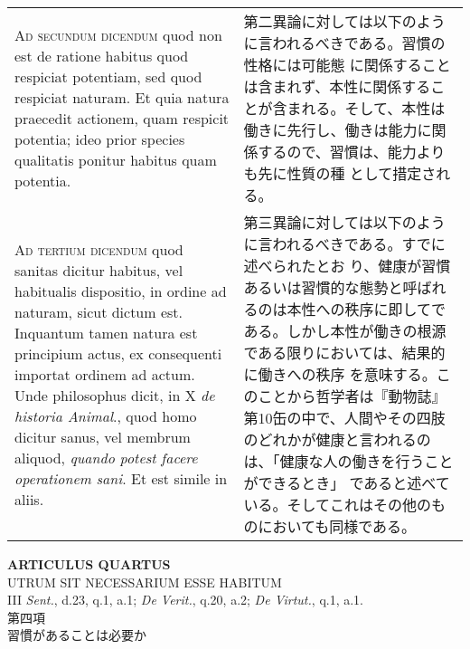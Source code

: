 \documentclass[10pt]{jsarticle} %
\begin{document}
\begin{longtable}{p{21em}p{21em}}
\\



{\scshape Ad secundum dicendum} quod non est de ratione habitus quod respiciat
potentiam, sed quod respiciat naturam. Et quia natura praecedit
actionem, quam respicit potentia; ideo prior species qualitatis
ponitur habitus quam potentia.

&

第二異論に対しては以下のように言われるべきである。習慣の性格には可能態
に関係することは含まれず、本性に関係することが含まれる。そして、本性は
働きに先行し、働きは能力に関係するので、習慣は、能力よりも先に性質の種
として措定される。

\\



{\scshape Ad tertium dicendum} quod sanitas dicitur habitus, vel habitualis
dispositio, in ordine ad naturam, sicut dictum est. Inquantum tamen
natura est principium actus, ex consequenti importat ordinem ad
actum. Unde philosophus dicit, in X {\itshape de historia Animal}., quod homo
dicitur sanus, vel membrum aliquod, {\itshape quando potest facere operationem
sani}. Et est simile in aliis.

&

第三異論に対しては以下のように言われるべきである。すでに述べられたとお
り、健康が習慣あるいは習慣的な態勢と呼ばれるのは本性への秩序に即してで
ある。しかし本性が働きの根源である限りにおいては、結果的に働きへの秩序
を意味する。このことから哲学者は『動物誌』第10缶の中で、人間やその四肢
のどれかが健康と言われるのは、「健康な人の働きを行うことができるとき」
であると述べている。そしてこれはその他のものにおいても同様である。

\\

\end{longtable}
\newpage


\begin{center}
{\Large {\bf ARTICULUS QUARTUS}}\\
{\large UTRUM SIT NECESSARIUM ESSE HABITUM}\\
{\footnotesize III {\itshape Sent.}, d.23, q.1, a.1; {\itshape De
 Verit.}, q.20, a.2; {\itshape De Virtut.}, q.1, a.1.}\\
{\Large 第四項\\習慣があることは必要か}
\end{center}
\end{document}
